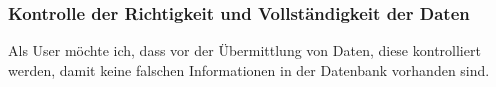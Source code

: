 \begin{flushleft}
\subsubsection{Kontrolle der Richtigkeit und Vollständigkeit der Daten}
\label{ssub:Kontrolle der Richtigkeit der Daten}
Als User möchte ich, dass vor der Übermittlung von Daten, diese kontrolliert werden, damit keine falschen Informationen in der Datenbank vorhanden sind.

\end{flushleft}






